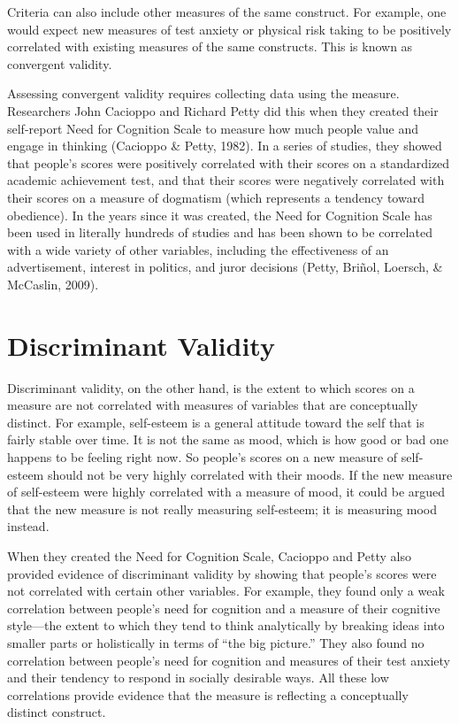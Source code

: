 \documentclass[]{book}
\theoremstyle{definition}
\theoremstyle{definition}
\theoremstyle{remark}
\begin{document}
Criteria can also include other measures of the same construct. For
example, one would expect new measures of test anxiety or physical risk
taking to be positively correlated with existing measures of the same
constructs. This is known as convergent validity.

Assessing convergent validity requires collecting data using the
measure. Researchers John Cacioppo and Richard Petty did this when they
created their self-report Need for Cognition Scale to measure how much
people value and engage in thinking (Cacioppo \& Petty, 1982). In a
series of studies, they showed that people's scores were positively
correlated with their scores on a standardized academic achievement
test, and that their scores were negatively correlated with their scores
on a measure of dogmatism (which represents a tendency toward
obedience). In the years since it was created, the Need for Cognition
Scale has been used in literally hundreds of studies and has been shown
to be correlated with a wide variety of other variables, including the
effectiveness of an advertisement, interest in politics, and juror
decisions (Petty, Briñol, Loersch, \& McCaslin, 2009).

\section{Discriminant Validity}\label{discriminant-validity}

Discriminant validity, on the other hand, is the extent to which scores
on a measure are not correlated with measures of variables that are
conceptually distinct. For example, self-esteem is a general attitude
toward the self that is fairly stable over time. It is not the same as
mood, which is how good or bad one happens to be feeling right now. So
people's scores on a new measure of self-esteem should not be very
highly correlated with their moods. If the new measure of self-esteem
were highly correlated with a measure of mood, it could be argued that
the new measure is not really measuring self-esteem; it is measuring
mood instead.

When they created the Need for Cognition Scale, Cacioppo and Petty also
provided evidence of discriminant validity by showing that people's
scores were not correlated with certain other variables. For example,
they found only a weak correlation between people's need for cognition
and a measure of their cognitive style---the extent to which they tend
to think analytically by breaking ideas into smaller parts or
holistically in terms of ``the big picture.'' They also found no
correlation between people's need for cognition and measures of their
test anxiety and their tendency to respond in socially desirable ways.
All these low correlations provide evidence that the measure is
reflecting a conceptually distinct construct.
\end{document}
